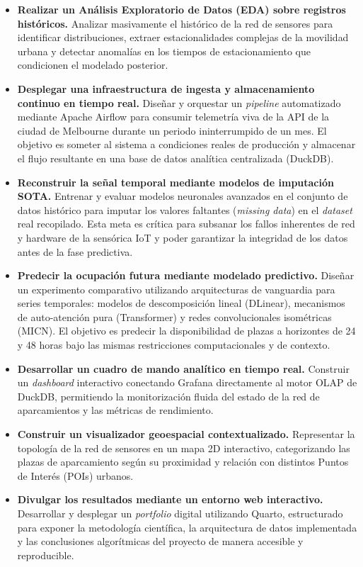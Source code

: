\begin{itemize}
	\item \textbf{Realizar un Análisis Exploratorio de Datos (EDA) sobre registros históricos.} Analizar masivamente el histórico de la red de sensores para identificar distribuciones, extraer estacionalidades complejas de la movilidad urbana y detectar anomalías en los tiempos de estacionamiento que condicionen el modelado posterior.
	
	\item \textbf{Desplegar una infraestructura de ingesta y almacenamiento continuo en tiempo real.} Diseñar y orquestar un \textit{pipeline} automatizado mediante Apache Airflow para consumir telemetría viva de la API de la ciudad de Melbourne durante un periodo ininterrumpido de un mes. El objetivo es someter al sistema a condiciones reales de producción y almacenar el flujo resultante en una base de datos analítica centralizada (DuckDB).
	
	\item \textbf{Reconstruir la señal temporal mediante modelos de imputación SOTA.} Entrenar y evaluar modelos neuronales avanzados en el conjunto de datos histórico para imputar los valores faltantes (\textit{missing data}) en el \textit{dataset} real recopilado. Esta meta es crítica para subsanar los fallos inherentes de red y hardware de la sensórica IoT y poder garantizar la integridad de los datos antes de la fase predictiva.
	
	\item \textbf{Predecir la ocupación futura mediante modelado predictivo.} Diseñar un experimento comparativo utilizando arquitecturas de vanguardia para series temporales: modelos de descomposición lineal (DLinear), mecanismos de auto-atención pura (Transformer) y redes convolucionales isométricas (MICN). El objetivo es predecir la disponibilidad de plazas a horizontes de 24 y 48 horas bajo las mismas restricciones computacionales y de contexto.
	
	\item \textbf{Desarrollar un cuadro de mando analítico en tiempo real.} Construir un \textit{dashboard} interactivo conectando Grafana directamente al motor OLAP de DuckDB, permitiendo la monitorización fluida del estado de la red de aparcamientos y las métricas de rendimiento.
	
	\item \textbf{Construir un visualizador geoespacial contextualizado.} Representar la topología de la red de sensores en un mapa 2D interactivo, categorizando las plazas de aparcamiento según su proximidad y relación con distintos Puntos de Interés (POIs) urbanos.
	
	\item \textbf{Divulgar los resultados mediante un entorno web interactivo.} Desarrollar y desplegar un \textit{portfolio} digital utilizando Quarto, estructurado para exponer la metodología científica, la arquitectura de datos implementada y las conclusiones algorítmicas del proyecto de manera accesible y reproducible.
\end{itemize}

